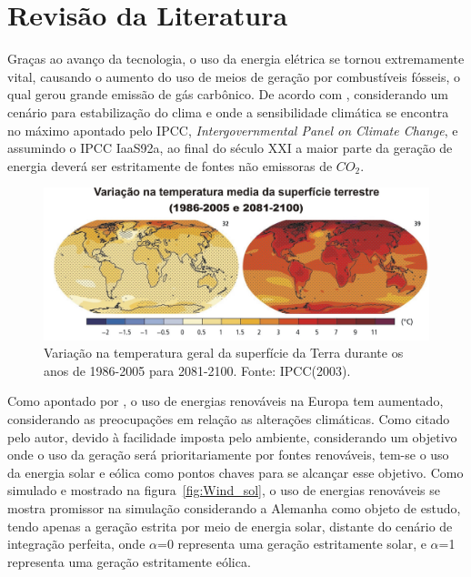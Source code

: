 \chapter{Revisão da Literatura}
\label{cap:02}
Graças ao avanço da tecnologia, o uso da energia elétrica se tornou extremamente vital, causando o aumento do uso de meios de geração por combustíveis fósseis, o qual gerou grande emissão de gás carbônico. De acordo com , considerando um cenário para estabilização do clima e onde a sensibilidade climática se encontra no máximo apontado pelo IPCC, \textit{Intergovernmental Panel on Climate Change}, e assumindo o IPCC IaaS92a, ao final do século XXI a maior parte da geração de energia deverá ser estritamente de fontes não emissoras de $CO_{2}$.

\FloatBarrier
\begin{figure}[htbp]
	\centering
	\includegraphics[scale=1.]{imagens/Temp_IPCC}
	\caption{Variação na temperatura geral da superfície da Terra durante os anos de 1986-2005 para 2081-2100. Fonte: IPCC(2003). }
	
	\label{fig:TempE}
\end{figure}
\FloatBarrier


Como apontado por , o uso de energias renováveis na Europa tem aumentado, considerando as preocupações em relação as alterações climáticas. Como citado pelo autor, devido à facilidade imposta pelo ambiente, considerando um objetivo onde o uso da geração será prioritariamente por fontes renováveis, tem-se o uso da energia solar e eólica como pontos chaves para se alcançar esse objetivo. Como simulado e mostrado na figura~\ref{fig:Wind_sol}, o uso de energias renováveis se mostra promissor na simulação considerando a Alemanha como objeto de estudo, tendo apenas a geração estrita por meio de energia solar, distante do cenário de integração perfeita, onde $\alpha$=0 representa uma geração estritamente solar, e $\alpha$=1 representa uma geração estritamente eólica.

